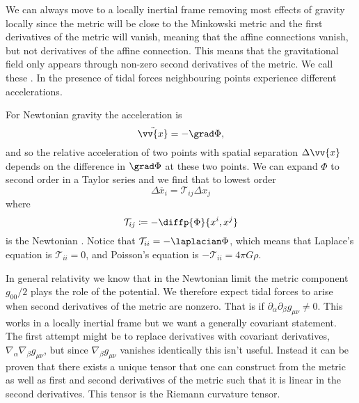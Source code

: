 \documentclass[fleqn]{NotesClass}
\newcommand*{\covariantDerivative}[1]{\nabla_{\!#1}}
\begin{document}
    We can always move to a locally inertial frame removing most effects of gravity locally since the metric will be close to the Minkowski metric and the first derivatives of the metric will vanish, meaning that the affine connections vanish, but not derivatives of the affine connection.
    This means that the gravitational field only appears through non-zero second derivatives of the metric.
    We call these .
    In the presence of tidal forces neighbouring points experience different accelerations.
    
    For Newtonian gravity the acceleration is
    \begin{equation}
        \ddot{\vv{x}} = - \grad \Phi,
    \end{equation}
    and so the relative acceleration of two points with spatial separation \(\Delta\vv{x}\) depends on the difference in \(\grad\Phi\) at these two points.
    We can expand \(\Phi\) to second order in a Taylor series and we find that to lowest order
    \begin{equation}
        \Delta \ddot{x_i} = \mathcal{T}_{ij} \Delta x_j
    \end{equation}
    where
    \begin{equation}
        \mathcal{T}_{ij} \coloneqq -\diffp{\Phi}{x^i, x^j}
    \end{equation}
    is the Newtonian .
    Notice that \(\mathcal{T}_{ii} = -\laplacian\Phi\), which means that Laplace's equation is \(\mathcal{T}_{ii} = 0\), and Poisson's equation is \(-\mathcal{T}_{ii} = 4\pi G\rho\).
    
    In general relativity we know that in the Newtonian limit the metric component \(g_{00}/2\) plays the role of the potential.
    We therefore expect tidal forces to arise when second derivatives of the metric are nonzero.
    That is if \(\partial_\alpha \partial_\beta g_{\mu\nu} \ne 0\).
    This works in a locally inertial frame but we want a generally covariant statement.
    The first attempt might be to replace derivatives with covariant derivatives, \(\covariantDerivative{\alpha}\covariantDerivative{\beta} g_{\mu\nu}\), but since \(\covariantDerivative{\beta}g_{\mu\nu}\) vanishes identically this isn't useful.
    Instead it can be proven that there exists a unique tensor that one can construct from the metric as well as first and second derivatives of the metric such that it is linear in the second derivatives.
    This tensor is the Riemann curvature tensor.
    
\end{document}
